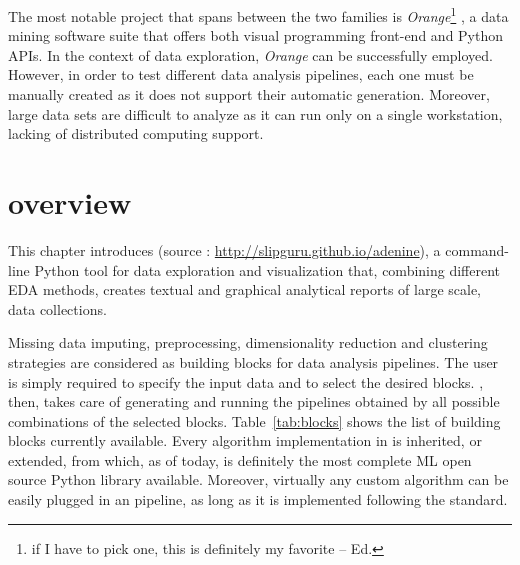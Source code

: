 The most notable project that spans between the two families is \emph{Orange}\footnote{if I have to pick one, this is definitely my favorite -- Ed.} \cite{demvsar2013orange}, a data mining software suite that offers both visual programming front-end and Python \ac{API}s. In the context of data exploration, \emph{Orange} can be successfully employed. However, in order to test different data analysis pipelines, each one must be manually created as it does not support their automatic generation.
Moreover, large data sets are difficult to analyze as it can run only on a single workstation, lacking of distributed computing support.

\section{\ade overview} \label{sec:adenine_overview}

This chapter introduces \ade (source : \url{http://slipguru.github.io/adenine}), a command-line Python tool for data exploration and visualization that, combining different EDA methods, creates textual and graphical analytical reports of large scale, data collections.

Missing data imputing, preprocessing, dimensionality reduction and clustering strategies are considered as building blocks for data analysis pipelines. The user is simply required to specify the input data and to select the desired blocks. \ade, then, takes care of generating and running the pipelines obtained by all possible combinations of the selected blocks.
Table~\ref{tab:blocks} shows the list of building blocks currently available.
Every algorithm implementation in \ade is inherited, or extended, from \sklearn \cite{scikit-learn} which, as of today, is definitely the most complete ML open source Python library available.
Moreover, virtually any custom algorithm can be easily plugged in an \ade pipeline, as long as it is implemented following the \sklearn standard.


